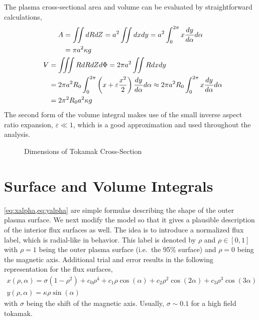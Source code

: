 The plasma cross-sectional area and volume can be evaluated by straightforward calculations,
\begin{gather}
\begin{split}
	A & = \iint dR dZ = a^2 \iint dx dy = a^2 \int_0^{2 \pi} x \frac{dy}{d\alpha} d\alpha \\ & = \pi a^2 \kappa g
\end{split} \\
\begin{split}
	\volume & = \iiint R dR dZ d\Phi = 2 \pi a^2 \iint R dx dy \\ & = 2 \pi a^2 R_0 \int_0^{2 \pi} \left( x + \varepsilon \frac{ x^2 }{ 2} \right) \frac{dy}{d\alpha} d\alpha \approx 2 \pi a^2 R_0 \int_0^{2 \pi} x \frac{dy}{d\alpha} d\alpha \\ & = 2 \pi^2 R_0 a^2 \kappa g
\end{split}
\end{gather}
The second form of the volume integral makes use of the small inverse aspect ratio expansion, $\varepsilon \ll 1 $, which is a good approximation and used throughout the analysis.

\begin{figure}[b]
\centering
\begin{adjustbox}{width=0.6\textwidth}
  \large
  
\end{adjustbox}
\caption{Dimensions of Tokamak Cross-Section}
\label{fig:dims}
\end{figure}

\section{Surface and Volume Integrals}

\cref{eq:xalpha,eq:yalpha} are simple formulas describing the shape of the outer plasma surface. We next modify the model so that it gives a plausible description of the interior flux surfaces as well. The idea is to introduce a normalized flux label, which is radial-like in behavior. This label is denoted by $\rho$ and $\rho \in [0,1]$ with $\rho = 1$ being the outer plasma surface (i.e.\ the 95\% surface) and $\rho = 0$ being the magnetic axis. Additional trial and error results in the following representation for the flux surfaces,
\begin{gather}
	x(\rho,\alpha) = \sigma( 1 - \rho^2 ) + c_0 \rho^4 + c_1 \rho \cos(\alpha) + c_2 \rho^2 \cos(2\alpha) +
		c_3 \rho^3 \cos(3\alpha) \\
	y(\rho, \alpha) = \kappa \rho \sin(\alpha)
\end{gather}
with $\sigma$ being the shift of the magnetic axis. Usually, $\sigma \sim 0.1$ for a high field tokamak.

